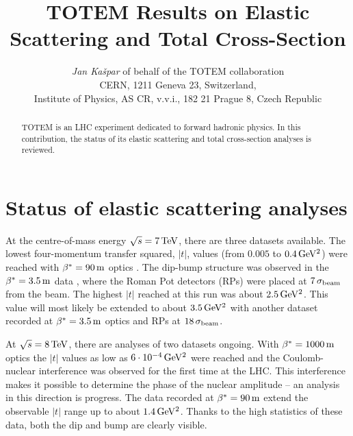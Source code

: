 \documentclass{desyproc}
\def\un#1{\,{\rm #1}}
\begin{document}
\title{TOTEM Results on Elastic Scattering and Total Cross-Section}

\author{{\slshape Jan Ka\v spar} of behalf of the TOTEM collaboration\\[1ex]
CERN, 1211 Geneva 23, Switzerland,\\
Institute of Physics, AS CR, v.v.i., 182 21 Prague 8, Czech Republic
}

 

\maketitle

\begin{abstract}
TOTEM \cite{totem_jinst} is an LHC experiment dedicated to forward hadronic physics. In this contribution, the status of its elastic scattering and total cross-section analyses is reviewed.
\end{abstract}

\section{Status of elastic scattering analyses}

At the centre-of-mass energy $\sqrt s = 7\un{TeV}$, there are three datasets available. The lowest four-momentum transfer squared, $|t|$, values (from $0.005$ to $0.4\un{GeV^2}$) were reached with $\beta^*=90\un{m}$ optics \cite{si_el_7_90b}. The dip-bump structure was observed in the $\beta^{*}=3.5\un{m}$ data \cite{si_el_7_3p5}, where the Roman Pot detectors (RPs) were placed at $7\un{\sigma_{\rm beam}}$ from the beam. The highest $|t|$ reached at this run was about $2.5\un{GeV^2}$. This value will most likely be extended to about $3.5\un{GeV^2}$ with another dataset recorded at $\beta^{*}=3.5\un{m}$ optics and RPs at $18\un{\sigma_{\rm beam}}$.

At $\sqrt s = 8\un{TeV}$, there are analyses of two datasets ongoing. With $\beta^* = 1000\un{m}$ optics the $|t|$ values as low as $6\cdot10^{-4}\un{GeV^2}$ were reached and the Coulomb-nuclear interference was observed for the first time at the LHC. This interference makes it possible to determine the phase of the nuclear amplitude -- an analysis in this direction is progress. The data recorded at $\beta^* = 90\un{m}$ extend the observable $|t|$ range up to about $1.4\un{GeV^2}$. Thanks to the high statistics of these data, both the dip and bump are clearly visible.
\end{document}
